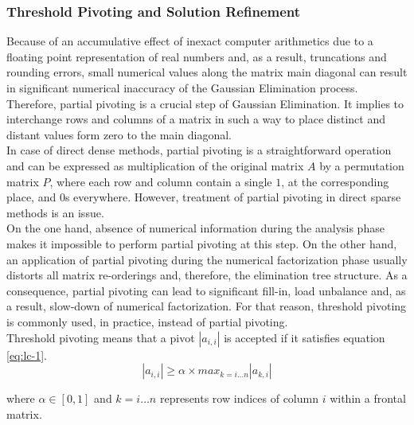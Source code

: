 \subsubsection{Threshold Pivoting and Solution Refinement}
\label{subseq:pivot-hadling}


Because of an accumulative effect of inexact computer arithmetics due to a floating point representation of real numbers and, as a result, truncations and rounding errors, small numerical values along the matrix main diagonal can result in significant numerical inaccuracy of the Gaussian Elimination process. Therefore, partial pivoting is a crucial step of Gaussian Elimination. It implies to interchange rows and columns of a matrix in such a way to place distinct and distant values form zero to the main diagonal.\\


In case of direct dense methods, partial pivoting is a straightforward operation and can be expressed as multiplication of the original matrix $A$ by a permutation matrix $P$, where each row and column contain a single $1$, at the corresponding place, and $0$s everywhere. However, treatment of partial pivoting in direct sparse methods is an issue.\\


On the one hand, absence of numerical information during the analysis phase makes it impossible to perform partial pivoting at this step. On the other hand, an application of partial pivoting during the numerical factorization phase usually distorts all matrix re-orderings and, therefore, the elimination tree structure. As a consequence, partial pivoting can lead to significant fill-in, load unbalance and, as a result, slow-down of numerical factorization. For that reason, threshold pivoting is commonly used, in practice, instead of partial pivoting.\\


Threshold pivoting means that a pivot $|a_{i,i}|$ is accepted if it satisfies equation \ref{eq:lc-1}.\\
\begin{equation}\label{eq:lc-1}
|a_{i,i}| \geq \alpha \times max_{k=i \dots n} |a_{k,i}|
\end{equation}

where $\alpha \in [0,1]$ and $k=i \dots n$ represents row indices of column $i$ within a frontal matrix.\\

